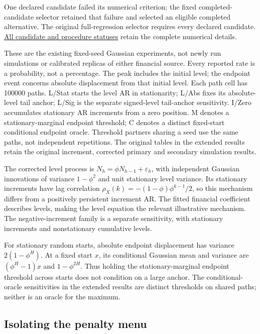 \documentclass[12pt,a4paper]{article}
\begin{document}
One declared candidate failed its numerical criterion; the fixed completed-candidate selector retained that failure and selected an eligible completed alternative. The original full-regression selector requires every declared candidate. \href{https://github.com/ByronLi0207/financial-mathematics-paper-20261020/blob/submission-final/EXTENDED_RESULTS.md#asmbi-extended-s24}{All candidate and procedure statuses} retain the complete numerical details.

These are the existing fixed-seed Gaussian experiments, not newly run
simulations or calibrated replicas of either financial source. Every reported
rate is a probability, not a percentage. The peak includes the initial level;
the endpoint event concerns absolute displacement from that initial level.
Each path cell has 100000 paths.
L/Stat starts the level AR in stationarity; L/Abs fixes its absolute-level
tail anchor; L/Sig is the separate signed-level tail-anchor sensitivity.
I/Zero accumulates stationary AR increments from a zero position.
M denotes a stationary-marginal endpoint threshold; C denotes a distinct
fixed-start conditional endpoint oracle. Threshold partners sharing a seed use
the same paths, not independent repetitions.
The original tables in the extended results retain the original increment, corrected primary and secondary simulation results.

The corrected level process is
\(N_h=\phi N_{h-1}+\varepsilon_h\), with independent Gaussian innovations
of variance \(1-\phi^2\) and unit stationary level variance. Its stationary
increments have lag correlation
\(\rho_X(k)=-(1-\phi)\phi^{k-1}/2\), so this mechanism differs from a
positively persistent increment AR. The fitted financial coefficient describes
levels, making the level equation the relevant illustrative mechanism.
The negative-increment family is a separate sensitivity, with stationary
increments and nonstationary cumulative levels.

For stationary random starts, absolute endpoint displacement has
variance \(2(1-\phi^H)\). At a fixed start \(x\), its conditional Gaussian
mean and variance are \((\phi^H-1)x\) and \(1-\phi^{2H}\). Thus holding the
stationary-marginal endpoint threshold across starts does not condition on a
large anchor. The conditional-oracle sensitivities in the extended results are distinct thresholds
on shared paths; neither is an oracle for the maximum.

\subsection{Isolating the penalty menu}\label{sec:extensions}
\end{document}
